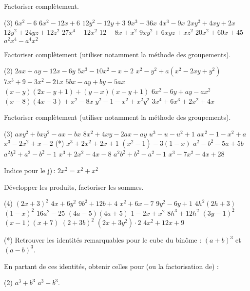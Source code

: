 \documentclass[a4paper,12pt]{report}
\begin{document}
\vspace*{-2\baselineskip}
\begin{acti}
Factoriser complètement.
	\begin{tasks}(3)
\task $6 x^2-6$
\task $6 x^2-12 x+6$
\task $12 y^2-12 y+3$
\task $9 x^3-36 x$
\task $4 x^3-9 x$
\task $2 x y^2+4 x y+2 x$
\task $12 y^2+24 y z+12 z^2$
\task $27 x^4-12 x^2$
\task $12-8 x+x^2$
\task $9 x y^2+6 x y z+x z^2$
\task $20 x^2+60 x+45$
\task $a^2 x^4-a^4 x^2$
	\end{tasks}
\end{acti}
\begin{acti}
Factoriser complètement (utiliser notamment la méthode des groupements).
	\begin{tasks}(2)
\task $2 a x+a y-12 x-6 y$
\task $5 x^3-10 x^2-x+2$
\task $x^2-y^2+a\left(x^2-2 x y+y^2\right)$
\task $7 x^3+9-3 x^2-21 x$
\task $5 b x-a y+b y-5 a x$
\task $(x-y)(2 x-y+1)+(y-x)(x-y+1)$
\task $6 x^2-6 y+a y-a x^2$
\task $(x-8)(4 x-3)+x^2-8 x$
\task $y^2-1-x^2+x^2 y^2$
\task $3 x^4+6 x^3+2 x^2+4 x$
	\end{tasks}
\end{acti}
\begin{acti}
Factoriser complètement (utiliser notamment la méthode des groupements).
	\begin{tasks}(3)
\task $a x y^2+b x y^2-a x-b x$
\task $8 x^2+4 x y-2 a x-a y$
\task $u^3-u-u^2+1$
\task $a x^2-1-x^2+a$
\task $x^3-2 x^2+x-2$
\task (*) $x^3+2 x^2+2 x+1$
\task $\left(x^2-1\right)-3(1-x)$
\task $a^2-b^2-5 a+5 b$
\task $a^2 b^2+a^2-b^2-1$
\task $x^3+2 x^2-4 x-8$
\task $a^2 b^2+b^2-a^2-1$
\task $x^3-7 x^2-4 x+28$
	\end{tasks}
	Indice pour le j)\,: $2 x^2=x^2+x^2$ 
\end{acti}
\begin{acti}
Développer les produits, factoriser les sommes.
	\begin{tasks}(4)
\task $(2 x+3)^2$
\task $4 x+6 y^2$
\task $9 b^2+12 b+4$
\task $x^2+6 x-7$
\task $9 y^2-6 y+1$
\task $4 h^2(2 h+3)$
\task $(1-x)^2$
\task $16 a^2-25$
\task $(4 a-5)(4 a+5)$
\task $1-2 x+x^2$
\task $8 h^3+12 h^2$
\task $(3 y-1)^2$
\task $(x-1)(x+7)$
\task $(2+3 b)^2$
\task $\left(2 x+3 y^2\right) \cdot 2$
\task $4 x^2+12 x+9$
	\end{tasks}
\end{acti}
\begin{acti}
(*) Retrouver les identités remarquables pour le cube du binôme : $(a+b)^3$ et $(a-b)^3$.

En partant de ces identités, obtenir celles pour (ou la factorisation de) :
	\begin{tasks}(2)
\task $a^3+b^3$
\task $a^3-b^3$.
	\end{tasks}
\end{acti}
\end{document}
